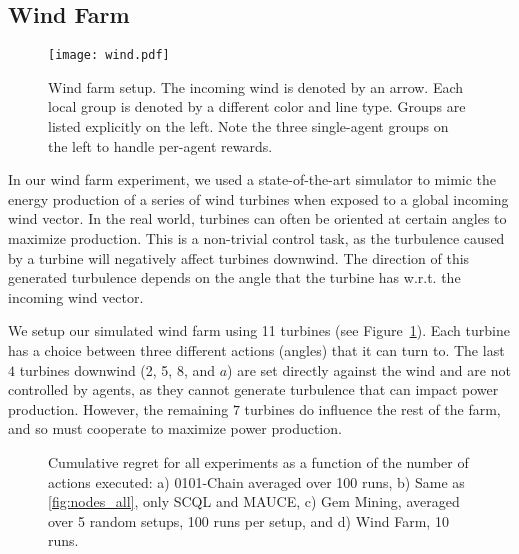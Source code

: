 \subsection{Wind Farm}\label{sec:wind}

\begin{figure}[!ht]
\centering
\texttt{[image: wind.pdf]}
\caption{Wind farm setup. The incoming wind is denoted by an arrow. Each local group is denoted by a
different color and line type. Groups are listed explicitly on the left. Note the three single-agent
groups on the left to handle per-agent rewards.}
\label{fig:wind_graph}
\end{figure}

In our wind farm experiment, we used a state-of-the-art simulator \cite{vandijk2016} to mimic the energy production of a series of wind turbines when exposed to a global incoming wind vector. In the real world, turbines can often be oriented at certain angles to maximize production. This is a non-trivial control task, as the turbulence caused by a turbine will negatively affect turbines downwind. The direction of this generated turbulence depends on the angle that the turbine has w.r.t. the incoming wind vector.

We setup our simulated wind farm using 11 turbines (see Figure~\ref{fig:wind_graph}). Each turbine has a
choice between three different actions (angles) that it can turn to. The last $4$ turbines downwind (2, 5, 8, and $a$)
are set directly against the wind and are not controlled by agents, as they cannot generate
turbulence that can impact power production. However, the remaining $7$ turbines do influence the
rest of the farm, and so must cooperate to maximize power production.

\begin{figure*}[ht!]
\centering
{}
\caption{Cumulative regret for all experiments as a function of the number of actions executed: a)
0101-Chain averaged over 100 runs, b) Same as \ref{fig:nodes_all}, only SCQL and MAUCE, c) Gem
Mining, averaged over 5 random setups, 100 runs per setup, and d) Wind Farm, 10 runs. }
\label{fig:nodes_results}
\end{figure*}

